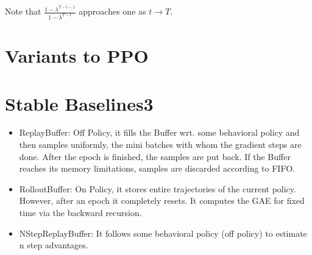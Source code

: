 \documentclass[../main.tex]{subfiles}  %
\begin{document}
Note that $\frac{1-\lambda^{T-t-1} }{1-\lambda^{T-t}} $ approaches one as $t \to T$.

\section{Variants to PPO}

\section{Stable Baselines3}
\begin{itemize}
    \item ReplayBuffer: Off Policy, it fills the Buffer wrt. some behavioral policy and then samples uniformly, the mini batches with whom the gradient steps are done. After the epoch is finished, the samples are put back. If the Buffer reaches its memory limitations, samples are discarded according to FIFO.
    \item RolloutBuffer: On Policy, it stores entire trajectories of the current policy. However, after an epoch it completely resets. It computes the GAE for fixed time via the backward recursion.
    \item NStepReplayBuffer: It follows some behavioral policy (off policy) to estimate n step advantages.
\end{itemize}
\end{document}
